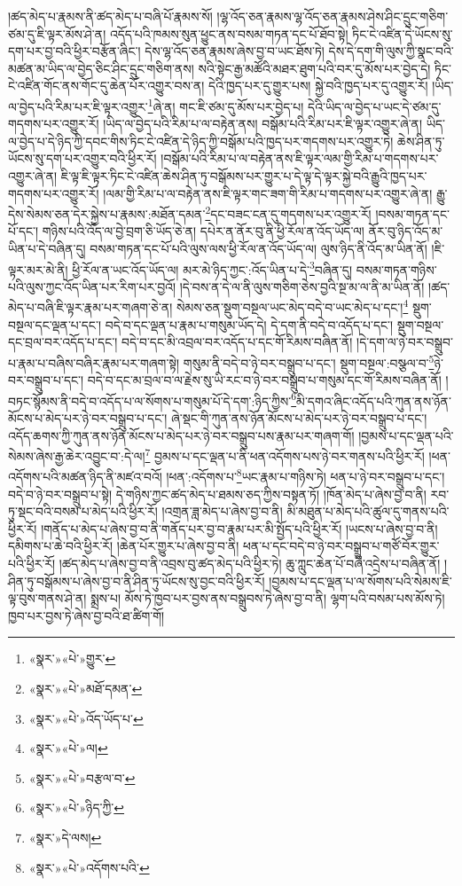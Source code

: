 །ཚད་མེད་པ་རྣམས་ནི་ཚད་མེད་པ་བཞི་པོ་རྣམས་སོ། །ལྷ་འོད་ཅན་རྣམས་ལྷ་འོད་ཅན་རྣམས་ཤེས་ཤིང་དྲུང་གཅིག་ཙམ་དུ་ཇི་ལྟར་མོས་ཤེ་ན། འདོད་པའི་ཁམས་སུན་ཕྱུང་ནས་བསམ་གཏན་དང་པོ་ཐོབ་སྟེ། ཏིང་ངེ་འཛིན་དེ་ཡོངས་སུ་དག་པར་བྱ་བའི་ཕྱིར་བརྩོན་ཞིང་། དེས་ལྷ་འོད་ཅན་རྣམས་ཞེས་བྱ་བ་ཡང་ཐོས་ཏེ། དེས་དེ་དག་གི་ལུས་ཀྱི་སྣང་བའི་མཚན་མ་ཡིད་ལ་བྱེད་ཅིང་ཤིང་དྲུང་གཅིག་ནས། སའི་སྟེང་རྒྱ་མཚོའི་མཐར་ཐུག་པའི་བར་དུ་མོས་པར་བྱེད་དེ། ཏིང་ངེ་འཛིན་གོང་ནས་གོང་དུ་ཆེན་པོར་འགྱུར་བས་ན། དེའི་ཁྱད་པར་དུ་གྱུར་པས། སྐྱེ་བའི་ཁྱད་པར་དུ་འགྱུར་རོ། །ཡིད་ལ་བྱེད་པའི་རིམ་པར་ཇི་ལྟར་འགྱུར་\footnote{«སྣར་»«པེ་»གྱུར་}ཞེ་ན། གང་ཇི་ཙམ་དུ་མོས་པར་བྱེད་པ། དེའི་ཡིད་ལ་བྱེད་པ་ཡང་དེ་ཙམ་དུ་གདགས་པར་འགྱུར་རོ། །ཡིད་ལ་བྱེད་པའི་རིམ་པ་ལ་བརྟེན་ནས། བསྒོམ་པའི་རིམ་པར་ཇི་ལྟར་འགྱུར་ཞེ་ན། ཡིད་ལ་བྱེད་པ་དེ་ཉིད་ཀྱི་དབང་གིས་ཏིང་ངེ་འཛིན་དེ་ཉིད་ཀྱི་བསྒོམ་པའི་ཁྱད་པར་གདགས་པར་འགྱུར་ཏེ། ཆེས་ཤིན་ཏུ་ཡོངས་སུ་དག་པར་འགྱུར་བའི་ཕྱིར་རོ། །བསྒོམ་པའི་རིམ་པ་ལ་བརྟེན་ནས་ཇི་ལྟར་ལམ་གྱི་རིམ་པ་གདགས་པར་འགྱུར་ཞེ་ན། ཇི་ལྟ་ཇི་ལྟར་ཏིང་ངེ་འཛིན་ཆེས་ཤིན་ཏུ་བསྒོམས་པར་གྱུར་པ་དེ་ལྟ་དེ་ལྟར་སྐྱེ་བའི་རྒྱུའི་ཁྱད་པར་གདགས་པར་འགྱུར་རོ། །ལམ་གྱི་རིམ་པ་ལ་བརྟེན་ནས་ཇི་ལྟར་གང་ཟག་གི་རིམ་པ་གདགས་པར་འགྱུར་ཞེ་ན། རྒྱུ་དེས་སེམས་ཅན་དེར་སྐྱེས་པ་རྣམས་:མཐོན་དམན་\footnote{«སྣར་»«པེ་»མཐོ་དམན་}དང་བཟང་ངན་དུ་གདགས་པར་འགྱུར་རོ། །བསམ་གཏན་དང་པོ་དང་། གཉིས་པའི་འོད་ལ་བྱེ་བྲག་ཅི་ཡོད་ཅེ་ན། དཔེར་ན་ནོར་བུ་ནི་ཕྱི་རོལ་ན་འོད་ཡོད་ལ། ནོར་བུ་ཉིད་འོད་མ་ཡིན་པ་དེ་བཞིན་དུ། བསམ་གཏན་དང་པོ་པའི་ལུས་ལས་ཕྱི་རོལ་ན་འོད་ཡོད་ལ། ལུས་ཉིད་ནི་འོད་མ་ཡིན་ནོ། །ཇི་ལྟར་མར་མེ་ནི། ཕྱི་རོལ་ན་ཡང་འོད་ཡོད་ལ། མར་མེ་ཉིད་ཀྱང་:འོད་ཡིན་པ་དེ་\footnote{«སྣར་»«པེ་»འོད་ཡོད་པ་}བཞིན་དུ། བསམ་གཏན་གཉིས་པའི་ལུས་ཀྱང་འོད་ཡིན་པར་རིག་པར་བྱའོ། །དེ་བས་ན་དེ་ལ་ནི་ལུས་གཅིག་ཅེས་བྱའི་སྔ་མ་ལ་ནི་མ་ཡིན་ནོ། །ཚད་མེད་པ་བཞི་ཇི་ལྟར་རྣམ་པར་གཞག་ཅེ་ན། སེམས་ཅན་སྡུག་བསྔལ་ཡང་མེད་བདེ་བ་ཡང་མེད་པ་དང་།\footnote{«སྣར་»«པེ་»ལ།} སྡུག་བསྔལ་དང་ལྡན་པ་དང་། བདེ་བ་དང་ལྡན་པ་རྣམ་པ་གསུམ་ཡོད་དེ། དེ་དག་ནི་བདེ་བ་འདོད་པ་དང་། སྡུག་བསྔལ་དང་བྲལ་བར་འདོད་པ་དང་། བདེ་བ་དང་མི་འབྲལ་བར་འདོད་པ་དང་གོ་རིམས་བཞིན་ནོ། །དེ་དག་ལ་ཉེ་བར་བསྒྲུབ་པ་རྣམ་པ་བཞིས་བཞིར་རྣམ་པར་གཞག་སྟེ། གསུམ་ནི་བདེ་བ་ཉེ་བར་བསྒྲུབ་པ་དང་། སྡུག་བསྔལ་:བསྩལ་བ་\footnote{«སྣར་»«པེ་»བརྩལ་བ་}ཉེ་བར་བསྒྲུབ་པ་དང་། བདེ་བ་དང་མ་བྲལ་བ་ལ་རྗེས་སུ་ཡི་རང་བ་ཉེ་བར་བསྒྲུབ་པ་གསུམ་དང་གོ་རིམས་བཞིན་ནོ། །བཏང་སྙོམས་ནི་བདེ་བ་འདོད་པ་ལ་སོགས་པ་གསུམ་པོ་དེ་དག་:ཉིད་ཀྱིས་\footnote{«སྣར་»«པེ་»ཉིད་ཀྱི་}མི་དགའ་ཞིང་འདོད་པའི་ཀུན་ནས་ཉོན་མོངས་པ་མེད་པར་ཉེ་བར་བསྒྲུབ་པ་དང་། ཞེ་སྡང་གི་ཀུན་ནས་ཉོན་མོངས་པ་མེད་པར་ཉེ་བར་བསྒྲུབ་པ་དང་། འདོད་ཆགས་ཀྱི་ཀུན་ནས་ཉོན་མོངས་པ་མེད་པར་ཉེ་བར་བསྒྲུབ་པས་རྣམ་པར་གཞག་གོ། །བྱམས་པ་དང་ལྡན་པའི་སེམས་ཞེས་རྒྱ་ཆེར་འབྱུང་བ་:དེ་ལ།\footnote{«སྣར་»དེ་ལས།} བྱམས་པ་དང་ལྡན་པ་ནི་ཕན་འདོགས་པས་ཉེ་བར་གནས་པའི་ཕྱིར་རོ། །ཕན་འདོགས་པའི་མཚན་ཉིད་ནི་མཛའ་བའོ། །ཕན་:འདོགས་པ་\footnote{«སྣར་»«པེ་»འདོགས་པའི་}ཡང་རྣམ་པ་གཉིས་ཏེ། ཕན་པ་ཉེ་བར་བསྒྲུབ་པ་དང་། བདེ་བ་ཉེ་བར་བསྒྲུབ་པ་སྟེ། དེ་གཉིས་ཀྱང་ཚད་མེད་པ་ཐམས་ཅད་ཀྱིས་བསྟན་ཏོ། །ཁོན་མེད་པ་ཞེས་བྱ་བ་ནི། རབ་ཏུ་སྡང་བའི་བསམ་པ་མེད་པའི་ཕྱིར་རོ། །འགྲན་ཟླ་མེད་པ་ཞེས་བྱ་བ་ནི། མི་མཐུན་པ་མེད་པའི་ཚུལ་དུ་གནས་པའི་ཕྱིར་རོ། །གནོད་པ་མེད་པ་ཞེས་བྱ་བ་ནི་གནོད་པར་བྱ་བ་རྣམ་པར་མི་སྤྱོད་པའི་ཕྱིར་རོ། །ཡངས་པ་ཞེས་བྱ་བ་ནི། དམིགས་པ་ཆེ་བའི་ཕྱིར་རོ། །ཆེན་པོར་གྱུར་པ་ཞེས་བྱ་བ་ནི། ཕན་པ་དང་བདེ་བ་ཉེ་བར་བསྒྲུབ་པ་གཙོ་བོར་གྱུར་པའི་ཕྱིར་རོ། །ཚད་མེད་པ་ཞེས་བྱ་བ་ནི་འབྲས་བུ་ཚད་མེད་པའི་ཕྱིར་ཏེ། ཆུ་ཀླུང་ཆེན་པོ་བཞི་འདྲེས་པ་བཞིན་ནོ། །ཤིན་ཏུ་བསྒོམས་པ་ཞེས་བྱ་བ་ནི་ཤིན་ཏུ་ཡོངས་སུ་བྱང་བའི་ཕྱིར་རོ། །བྱམས་པ་དང་ལྡན་པ་ལ་སོགས་པའི་སེམས་ཇི་ལྟ་བུས་གནས་ཤེ་ན། སྨྲས་པ། མོས་ཏེ་ཁྱབ་པར་བྱས་ནས་བསྒྲུབས་ཏེ་ཞེས་བྱ་བ་ནི། ལྷག་པའི་བསམ་པས་མོས་ཏེ། ཁྱབ་པར་བྱས་ཏེ་ཞེས་བྱ་བའི་ཐ་ཚིག་གོ། 